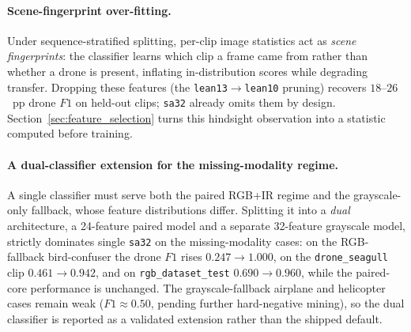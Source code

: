 \paragraph{Scene-fingerprint over-fitting.}
Under sequence-stratified splitting, per-clip image statistics act as \emph{scene fingerprints}: the classifier learns which clip a frame came from rather than whether a drone is present, inflating in-distribution scores while degrading transfer. Dropping these features (the \texttt{lean13}$\to$\texttt{lean10} pruning) recovers $18$--$26$~pp drone $F1$ on held-out clips; \texttt{sa32} already omits them by design. Section~\ref{sec:feature_selection} turns this hindsight observation into a statistic computed before training.

\paragraph{A dual-classifier extension for the missing-modality regime.}
A single classifier must serve both the paired RGB+IR regime and the grayscale-only fallback, whose feature distributions differ. Splitting it into a \emph{dual} architecture, a 24-feature paired model and a separate 32-feature grayscale model, strictly dominates single \texttt{sa32} on the missing-modality cases: on the RGB-fallback bird-confuser the drone $F1$ rises $0.247\to1.000$, on the \texttt{drone\_seagull} clip $0.461\to0.942$, and on \texttt{rgb\_dataset\_test} $0.690\to0.960$, while the paired-core performance is unchanged. The grayscale-fallback airplane and helicopter cases remain weak ($F1\approx0.50$, pending further hard-negative mining), so the dual classifier is reported as a validated extension rather than the shipped default.

